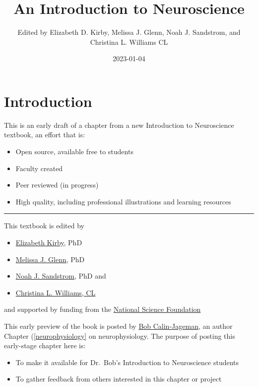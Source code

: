 \documentclass[
]{book}
\title{An Introduction to Neuroscience}
\author{Edited by Elizabeth D. Kirby, Melissa J. Glenn, Noah J. Sandstrom, and Christina L. Williams CL}
\date{2023-01-04}
\providecommand{\tightlist}{%
  \setlength{\itemsep}{0pt}\setlength{\parskip}{0pt}}
\begin{document}
\maketitle

{
\setcounter{tocdepth}{1}
\tableofcontents
}
\hypertarget{introduction}{%
\chapter{Introduction}\label{introduction}}

This is an early draft of a chapter from a new Introduction to Neuroscience textbook, an effort that is:

\begin{itemize}
\item
  Open source, available free to students
\item
  Faculty created
\item
  Peer reviewed (in progress)
\item
  High quality, including professional illustrations and learning resources
\end{itemize}

\begin{center}\rule{0.5\linewidth}{0.5pt}\end{center}

This textbook is edited by

\begin{itemize}
\tightlist
\item
  \href{https://u.osu.edu/kirbylab/}{Elizabeth Kirby}, PhD
\item
  \href{https://web.colby.edu/mjglenn/about-me/}{Melissa J. Glenn}, PhD
\item
  \href{https://psychology.williams.edu/profile/nsandstr/}{Noah J. Sandstrom}, PhD and
\item
  \href{https://scholars.duke.edu/person/williams}{Christina L. Williams, CL}
\end{itemize}

and supported by funding from the \href{https://www.nsf.gov/awardsearch/simpleSearchResult?queryText=elizabeth+kirby\&ActiveAwards=true}{National Science Foundation}

This early preview of the book is posted by \href{https://calin-jageman.net/lab/}{Bob Calin-Jageman}, an author Chapter (\ref{neurophysiology} on neurophysiology. The purpose of posting this early-stage chapter here is:

\begin{itemize}
\item
  To make it available for Dr.~Bob's Introduction to Neuroscience students
\item
  To gather feedback from others interested in this chapter or project
\end{itemize}
\end{document}

